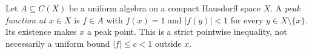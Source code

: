 
Let $A\subseteq C(X)$ be a uniform algebra on a compact Hausdorff space $X$. A \emph{peak function at $x\in X$} is $f\in A$ with $f(x)=1$ and $|f(y)|<1$ for every $y\in X\setminus\{x\}$. Its existence makes $x$ a peak point. This is a strict pointwise inequality, not necessarily a uniform bound $|f|\le c<1$ outside $x$.
